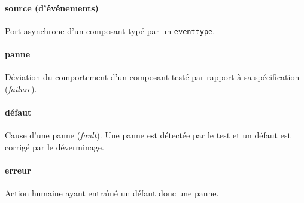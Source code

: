 \paragraph{source (d'\'ev\'enements)}
Port asynchrone d'un composant typ\'e par un \texttt{eventtype}.

\paragraph{panne}
D\'eviation du comportement d'un composant test\'e par rapport \`a
sa sp\'ecification (\emph{failure}).

\paragraph{d\'efaut}
Cause d'une panne (\emph{fault}). Une panne est d\'etect\'ee par le
test et un d\'efaut est corrig\'e par le d\'everminage.

\paragraph{erreur}
Action humaine ayant entra\^{\i}n\'e un d\'efaut donc une panne.


